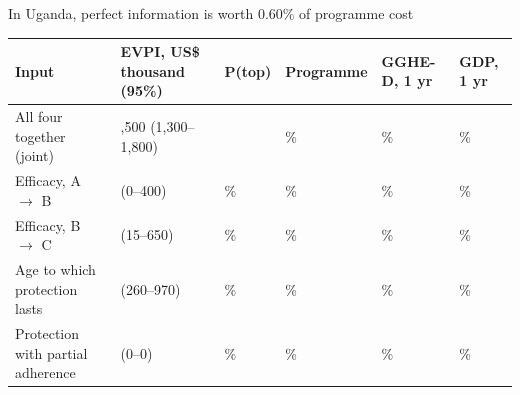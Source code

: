 \documentclass[
  ignorenonframetext,
  aspectratio=169]{beamer}
\newcommand{\sourceline}[1]{\par\vspace{4pt}{\footnotesize\raggedright\textcolor{black!60}{#1}\par}}
\begin{document}
\begin{frame}{In Uganda, perfect information is worth 0.60\% of
programme cost}
\label{in-uganda-perfect-information-is-worth-0.60-of-programme-cost}
\setlength{\tabcolsep}{3pt}

\begin{table}
\centering\begingroup\fontsize{10}{12}\selectfont

\begin{tabular}[t]{>{\raggedright\arraybackslash}p{3.4cm}>{\raggedleft\arraybackslash}p{2.9cm}>{\raggedleft\arraybackslash}p{1.1cm}>{\raggedleft\arraybackslash}p{1.6cm}>{\raggedleft\arraybackslash}p{1.6cm}>{\raggedleft\arraybackslash}p{1.8cm}}
\toprule
Input & EVPI, US\$ thousand (95\%) & P(top) & Programme & GGHE-D, 1 yr & GDP, 1 yr\\
\midrule
All four together (joint) & 1,500 (1,300--1,800) &  & 0.60\% & 0.31\% & 0.0028\%\\
Efficacy, A $\rightarrow$ B & 58 (0--400) & 0.0\% & 0.023\% & 0.012\% & 0.00011\%\\
Efficacy, B $\rightarrow$ C & 220 (15--650) & 2.9\% & 0.085\% & 0.043\% & 0.00040\%\\
Age to which protection lasts & 610 (260--970) & 97.1\% & 0.24\% & 0.12\% & 0.0011\%\\
Protection with partial adherence & 0 (0--0) & 0.0\% & 0\% & 0\% & 0\%\\
\bottomrule
\end{tabular}
\endgroup{}
\end{table}

\sourceline{VSL $\times$ 1, 2026--2050, constant 2025 US\$. P(top): share of bootstrap replicates in which the input alone ranks first. Joint EVPI / expected incremental cost (US\$21.4m): 7.2\%.}
\end{frame}
\end{document}
